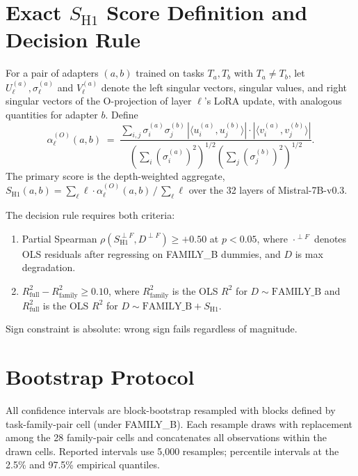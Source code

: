 \documentclass[10pt]{article}
\begin{document}


\appendix

\section{Exact $S_{\mathrm{H1}}$ Score Definition and Decision Rule}
\label{app:score}

For a pair of adapters $(a, b)$ trained on tasks $T_a, T_b$ with
$T_a \neq T_b$, let $U^{(a)}_\ell, \sigma^{(a)}_\ell$ and
$V^{(a)}_\ell$ denote the left singular vectors, singular values, and
right singular vectors of the O-projection of layer $\ell$'s LoRA
update, with analogous quantities for adapter $b$. Define
\begin{equation*}
\alpha^{(O)}_\ell(a, b)
\;=\; \frac{\sum_{i, j} \sigma^{(a)}_i \sigma^{(b)}_j \,
  |\langle u^{(a)}_i, u^{(b)}_j \rangle| \cdot
  |\langle v^{(a)}_i, v^{(b)}_j \rangle|}
{\left(\sum_i (\sigma^{(a)}_i)^2\right)^{1/2}
 \left(\sum_j (\sigma^{(b)}_j)^2\right)^{1/2}}.
\end{equation*}
The primary score is the depth-weighted aggregate,
$S_{\mathrm{H1}}(a, b) = \sum_\ell \ell \cdot \alpha^{(O)}_\ell(a, b) \,/\, \sum_\ell \ell$
over the 32 layers of Mistral-7B-v0.3.

The decision rule requires both criteria:
\begin{enumerate}
  \item Partial Spearman
    $\rho(S_{\mathrm{H1}}^{\perp F}, D^{\perp F}) \geq +0.50$
    at $p < 0.05$, where $\cdot^{\perp F}$ denotes OLS residuals
    after regressing on FAMILY\_B dummies, and $D$ is max
    degradation.
  \item $R^2_{\mathrm{full}} - R^2_{\mathrm{family}} \geq 0.10$,
    where $R^2_{\mathrm{family}}$ is the OLS $R^2$ for
    $D \sim \mathrm{FAMILY\_B}$ and $R^2_{\mathrm{full}}$ is the
    OLS $R^2$ for $D \sim \mathrm{FAMILY\_B} + S_{\mathrm{H1}}$.
\end{enumerate}
Sign constraint is absolute: wrong sign fails regardless of
magnitude.

\section{Bootstrap Protocol}
\label{app:bootstrap}

All confidence intervals are block-bootstrap resampled with blocks
defined by task-family-pair cell (under FAMILY\_B). Each resample
draws with replacement among the 28 family-pair cells and
concatenates all observations within the drawn cells. Reported
intervals use 5,000 resamples; percentile intervals at the 2.5\%
and 97.5\% empirical quantiles.
\end{document}
